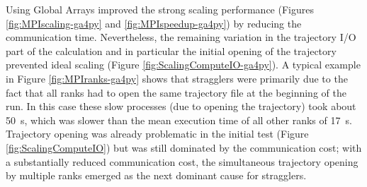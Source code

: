 Using Global Arrays improved the strong scaling performance (Figures \ref{fig:MPIscaling-ga4py} and \ref{fig:MPIspeedup-ga4py}) by reducing the communication time.
Nevertheless, the remaining variation in the trajectory I/O part of the calculation and in particular the initial opening of the trajectory prevented ideal scaling (Figure \ref{fig:ScalingComputeIO-ga4py}).
A typical example in Figure \ref{fig:MPIranks-ga4py} shows that stragglers were primarily due to the fact that all ranks had to open the same trajectory file at the beginning of the run.
In this case these slow processes (due to opening the trajectory) took about 50~s, which was slower than the mean execution time of all other ranks of 17~s. 
Trajectory opening was already problematic in the initial test (Figure \ref{fig:ScalingComputeIO}) but was still dominated by the communication cost; with a substantially reduced communication cost, the simultaneous trajectory opening by multiple ranks emerged as the next dominant cause for stragglers.


